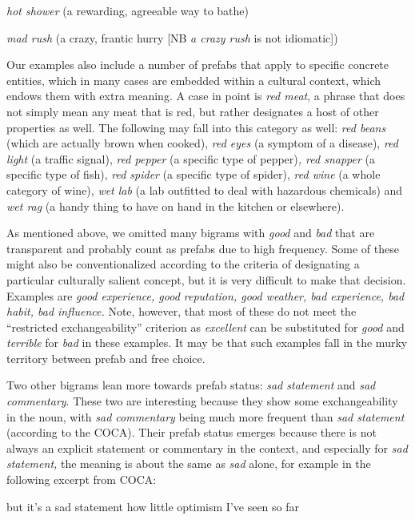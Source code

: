 \documentclass[output=paper]{langscibook}
\begin{document}
\textit{hot shower} (a rewarding, agreeable way to bathe)

\textit{mad rush} (a crazy, frantic hurry [NB \textit{a crazy rush} is not idiomatic])
\z

Our examples also include a number of prefabs that apply to specific concrete entities, which in many cases are embedded within a cultural context, which endows them with extra meaning. A case in point is \textit{red meat}, a phrase that does not simply mean any meat that is red, but rather designates a host of other properties as well. The following may fall into this category as well: \textit{red beans} (which are actually brown when cooked), \textit{red eyes} (a symptom of a disease), \textit{red light} (a traffic signal), \textit{red pepper} (a specific type of pepper)\textit{, red snapper} (a specific type of fish), \textit{red spider} (a specific type of spider), \textit{red wine} (a whole category of wine), \textit{wet lab} (a lab outfitted to deal with hazardous chemicals) and \textit{wet rag} (a handy thing to have on hand in the kitchen or elsewhere).

As mentioned above, we omitted many bigrams with \textit{good} and \textit{bad} that are transparent and probably count as prefabs due to high frequency. Some of these might also be conventionalized according to the criteria of designating a particular culturally salient concept, but it is very difficult to make that decision. Examples are \textit{good experience, good reputation, good weather, bad experience, bad habit, bad influence.} Note, however, that most of these do not meet the ``restricted exchangeability'' criterion as \textit{excellent} can be substituted for \textit{good} and \textit{terrible} for \textit{bad} in these examples. It may be that such examples fall in the murky territory between prefab and free choice. 

Two other bigrams lean more towards prefab status: \textit{sad statement} and \textit{sad commentary}. These two are interesting because they show some exchangeability in the noun, with \textit{sad commentary} being much more frequent than \textit{sad statement} (according to the COCA). Their prefab status emerges because there is not always an explicit statement or commentary in the context, and especially for \textit{sad statement,} the meaning is about the same as \textit{sad} alone, for example in the following excerpt from COCA:

\ea\label{ex:bybee:6}
 but it's a sad statement how little optimism I've seen so far
\z
\end{document}
